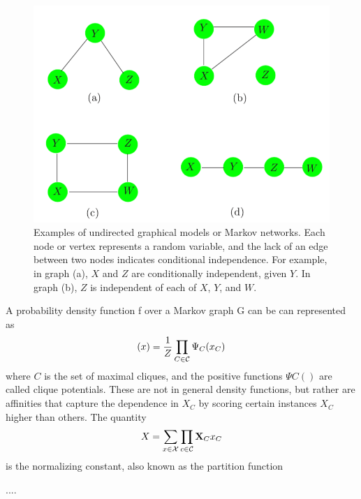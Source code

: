 \documentclass[12pt, letterpaper]{article}
\theoremstyle{definition}
\newcommand{\X}{\mathrm{\mathbf{X}}}
\begin{document}
\begin{figure}
\centering
\includegraphics[scale=0.45]{img/graphs}
\caption{Examples of undirected graphical models or Markov networks. Each node or vertex represents a random variable, and the lack of an edge between two nodes indicates conditional independence. For example, in graph (a), $X$ and $Z$ are conditionally independent, given $Y$. In graph (b), $Z$ is independent of each of $X$, $Y$, and $W$.}
\label{graphs}
\end{figure}
A probability density function f over a Markov graph G can be can represented as
\begin{equation}
(x) = \frac{1}{Z} \prod_{C \in \CMcal{C}} \Psi_C (x_C)
\end{equation}
where $C$ is the set of maximal cliques, and the positive functions $\Psi C()$ are called clique potentials.  These are not in general density functions, but rather are affinities that capture the dependence in $X_C$ by scoring certain instances $X_C$ higher than others. The quantity
\begin{equation}
X = \sum_{x \in \CMcal{X}} \prod_{c \in \CMcal{C}} \X_C{x_C}
\end{equation}
is the normalizing constant, also known as the partition function

....
\end{document}
